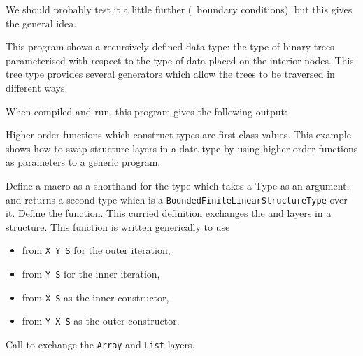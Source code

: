 We should probably test it a little further (\eg{}~boundary conditions),
but this gives the general idea.

\newpage
{}

This program shows a recursively defined data type:
the type of binary trees parameterised with respect to the type
of data placed on the interior nodes.  This tree type provides
several generators which allow the trees to be traversed in different ways.


When compiled and run, this program gives the following output:
\begin{small}

\end{small}





\newpage
{}

Higher order functions which construct types are first-class values.  
This example shows how to swap structure layers in a data type
by using higher order functions as parameters to a generic program.


\begin{description}
 Define a macro  as a shorthand for the type
which takes a Type as an argument, and returns a second type which
is a {\tt BoundedFiniteLinearStructureType} over it.
 Define the  function.  This curried definition
exchanges the  and  layers in a structure.
This function is written generically to use
\begin{itemize}
\item {} from \verb"X Y S" for the outer iteration,
\item {} from \verb"Y S" for the inner iteration,
\item {} from \verb"X S" as the inner constructor,
\item {} from \verb"Y X S" as the outer constructor.
\end{itemize}

 Call  to exchange the \verb"Array"
and \verb"List" layers.
\end{description}

